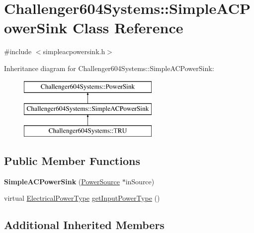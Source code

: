 \hypertarget{class_challenger604_systems_1_1_simple_a_c_power_sink}{\section{Challenger604\-Systems\-:\-:Simple\-A\-C\-Power\-Sink Class Reference}
\label{class_challenger604_systems_1_1_simple_a_c_power_sink}
}


{\ttfamily \#include $<$simpleacpowersink.\-h$>$}

Inheritance diagram for Challenger604\-Systems\-:\-:Simple\-A\-C\-Power\-Sink\-:\begin{figure}[H]
\begin{center}
\leavevmode
\includegraphics[height=3.000000cm]{class_challenger604_systems_1_1_simple_a_c_power_sink}
\end{center}
\end{figure}
\subsection*{Public Member Functions}
\begin{DoxyCompactItemize}
\item 
\hypertarget{class_challenger604_systems_1_1_simple_a_c_power_sink_aaa1094aa970694095629a10f94e5f2a4}{{\bfseries Simple\-A\-C\-Power\-Sink} (\hyperlink{class_challenger604_systems_1_1_power_source}{Power\-Source} $\ast$in\-Source)}\label{class_challenger604_systems_1_1_simple_a_c_power_sink_aaa1094aa970694095629a10f94e5f2a4}

\item 
virtual \hyperlink{namespace_challenger604_systems_a9ad1a793d94b97514092692cb7315afd}{Electrical\-Power\-Type} \hyperlink{class_challenger604_systems_1_1_simple_a_c_power_sink_a79b6956b98935e2b344c969a83540b54}{get\-Input\-Power\-Type} ()
\end{DoxyCompactItemize}
\subsection*{Additional Inherited Members}


